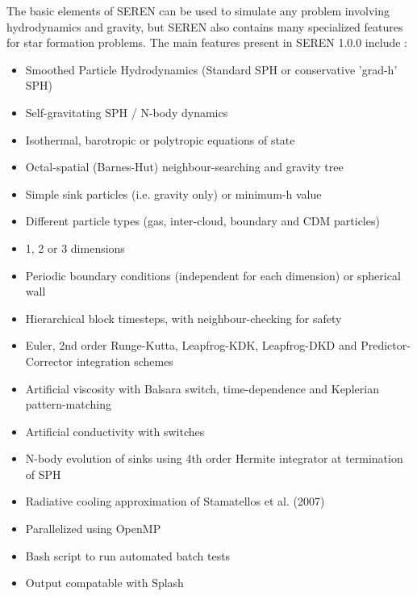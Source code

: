 \documentclass[a4paper]{article}
\newcommand{\NAME}{SEREN }
\newcommand{\VERNO}{1.0.0 }
\begin{document}
The basic elements of \NAME can be used to simulate any problem involving hydrodynamics and gravity, but \NAME also contains many specialized features for star formation problems.  The main features present in \NAME \VERNO  include : 
\begin{itemize}
\item Smoothed Particle Hydrodynamics (Standard SPH or conservative 'grad-h' SPH)
\item Self-gravitating SPH / N-body dynamics
\item Isothermal, barotropic or polytropic equations of state
\item Octal-spatial (Barnes-Hut) neighbour-searching and gravity tree
\item Simple sink particles (i.e. gravity only) or minimum-h value
\item Different particle types (gas, inter-cloud, boundary and CDM particles)
\item 1, 2 or 3 dimensions
\item Periodic boundary conditions (independent for each dimension) or spherical wall
\item Hierarchical block timesteps, with neighbour-checking for safety
\item Euler, 2nd order Runge-Kutta, Leapfrog-KDK, Leapfrog-DKD and 
Predictor-Corrector integration schemes
\item Artificial viscosity with Balsara switch, time-dependence and Keplerian pattern-matching
\item Artificial conductivity with switches
\item N-body evolution of sinks using 4th order Hermite integrator at termination of SPH
\item Radiative cooling approximation of Stamatellos et al. (2007)
\item Parallelized using OpenMP
\item Bash script to run automated batch tests
\item Output compatable with Splash
\end{itemize}
\end{document}
